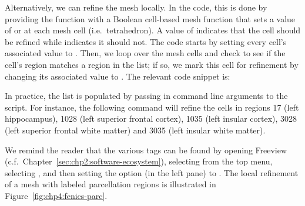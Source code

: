 
Alternatively, we can refine the mesh locally.  In the code, this is done by 
providing the  function with a Boolean cell-based mesh function
that sets a value of  or  at each mesh cell 
(i.e.~tetrahedron).  A value of  indicates that the cell should be 
refined while  indicates it should not.  The code starts by setting 
every cell's associated value to .  Then, we loop over the mesh 
cells and check to see if the cell's region matches a region in the 
 list; if so, we mark this cell for refinement by changing 
its associated value to .  The relevant code snippet is: 

In practice, the  list 
is populated by passing in command line arguments to the script.  For instance, 
the following command will refine the cells in regions 17 (left hippocampus), 
1028 (left superior frontal cortex), 1035 (left insular cortex), 3028 (left 
superior frontal white matter) and 3035 (left insular white matter).


We remind the reader that the various tags can be found by opening Freeview 
(c.f.~Chapter~\ref{sec:chp2:software-ecosystem}), selecting 
 from the top menu, selecting 
, and then setting the  option (in 
the left pane) to .  The local refinement of a mesh with 
labeled parcellation regions is illustrated in 
Figure~\ref{fig:chp4:fenics-parc}.



